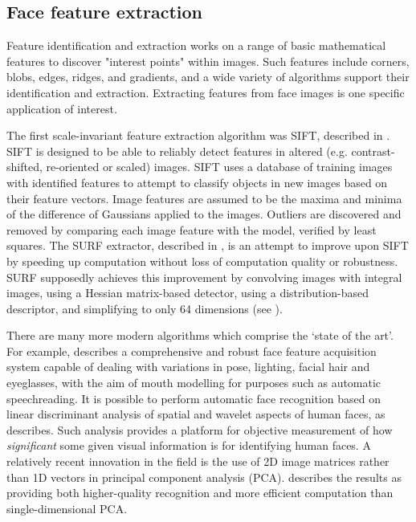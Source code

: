 \subsection{Face feature extraction}
\label{sec:features-prior}

Feature identification and extraction works on a range of basic mathematical features to discover "interest points" within images. Such features include corners, blobs, edges, ridges, and gradients, and a wide variety of algorithms support their identification and extraction. Extracting features from face images is one specific application of interest.

The first scale-invariant feature extraction algorithm was SIFT, described in \cite{SIFT}. SIFT is designed to be able to reliably detect features in altered (e.g. contrast-shifted, re-oriented or scaled) images. SIFT uses a database of training images with identified features to attempt to classify objects in new images based on their feature vectors. Image features are assumed to be the maxima and minima of the difference of Gaussians applied to the images. Outliers are discovered and removed by comparing each image feature with the model, verified by least squares. The SURF extractor, described in \cite{SURF}, is an attempt to improve upon SIFT by speeding up computation without loss of computation quality or robustness. SURF supposedly achieves this improvement by convolving images with integral images, using a Hessian matrix-based detector, using a distribution-based descriptor, and simplifying to only 64 dimensions (see \cite{SURF}).

There are many more modern algorithms which comprise the `state of the art'. For example, \cite{speechreading} describes a comprehensive and robust face feature acquisition system capable of dealing with variations in pose, lighting, facial hair and eyeglasses, with the aim of mouth modelling for purposes such as automatic speechreading. It is possible to perform automatic face recognition based on linear discriminant analysis of spatial and wavelet aspects of human faces, as \cite{discriminantanalysis} describes. Such analysis provides a platform for objective measurement of how \emph{significant} some given visual information is for identifying human faces. A relatively recent innovation in the field is the use of 2D image matrices rather than 1D vectors in principal component analysis (PCA). \cite{2d-pca} describes the results as providing both higher-quality recognition and more efficient computation than single-dimensional PCA.
